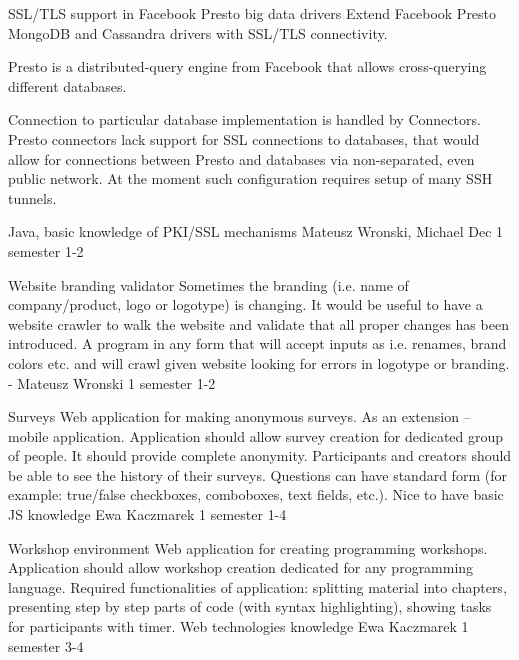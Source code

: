 \begin{project}
{SSL/TLS support in Facebook Presto big data drivers}
{Extend Facebook Presto MongoDB and Cassandra drivers with SSL/TLS connectivity.} 
{
Presto is a distributed-query engine from Facebook that allows cross-querying different databases.

Connection to particular database implementation is handled by Connectors. Presto connectors lack support for SSL connections to databases, that would allow for connections between Presto and databases via non-separated, even public network. At the moment such configuration requires setup of many SSH tunnels.
}
{Java, basic knowledge of PKI/SSL mechanisms}
{Mateusz Wronski, Michael Dec}
{1 semester}
{1-2}
\end{project}
\begin{project}
{Website branding validator}
{Sometimes the branding (i.e. name of company/product, logo or logotype) is changing. It would be useful to have a website crawler to walk the website and validate that all proper changes has been introduced.} 
{
A program in any form that will accept inputs as i.e. renames, brand colors etc. and will crawl given website looking for errors in logotype or branding.
}
{-}
{Mateusz Wronski}
{1 semester}
{1-2}
\end{project}
\begin{project}
{Surveys}
{Web application for making anonymous surveys. As an extension – mobile application.} 
{
Application should allow survey creation for dedicated group of people. It should provide complete anonymity. Participants and creators should be able to see the history of their surveys. Questions can have standard form (for example: true/false checkboxes, comboboxes, text fields, etc.).
}
{Nice to have basic JS knowledge}
{Ewa Kaczmarek}
{1 semester}
{1-4}
\end{project}
\begin{project}
{Workshop environment}
{Web application for creating programming workshops.} 
{
Application should allow workshop creation dedicated for any programming language. Required functionalities of application: splitting material into chapters, presenting step by step parts of code (with syntax highlighting), showing tasks for participants with timer.
}
{Web technologies knowledge}
{Ewa Kaczmarek}
{1 semester}
{3-4}
\end{project}
